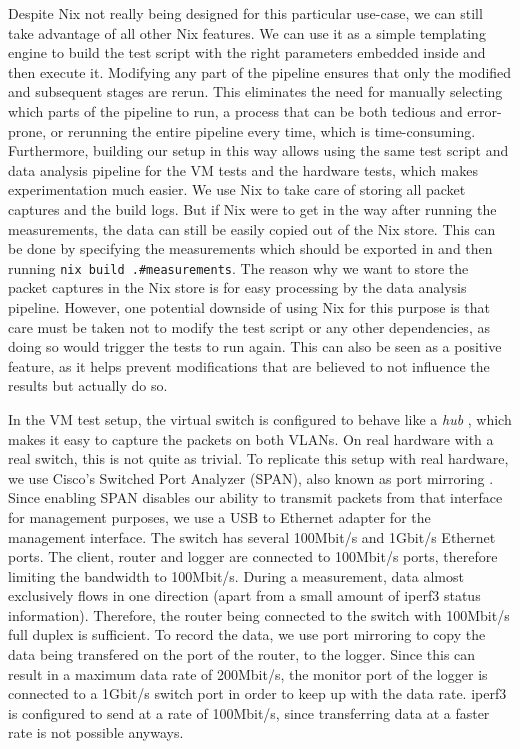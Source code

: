 Despite Nix not really being designed for this particular use-case, we can still take advantage of all other Nix features.
We can use it as a simple templating engine to build the test script with the right parameters embedded inside and then execute it.
Modifying any part of the pipeline ensures that only the modified and subsequent stages are rerun.
This eliminates the need for manually selecting which parts of the pipeline to run, a process that can be both tedious and error-prone, or rerunning the entire pipeline every time, which is time-consuming.
Furthermore, building our setup in this way allows using the same test script and data analysis pipeline for the VM tests and the hardware tests, which makes experimentation much easier.
We use Nix to take care of storing all packet captures and the build logs.
But if Nix were to get in the way after running the measurements, the data can still be easily copied out of the Nix store.
This can be done by specifying the measurements which should be exported in  and then running \texttt{nix build .#measurements}.
The reason why we want to store the packet captures in the Nix store is for easy processing by the data analysis pipeline.
However, one potential downside of using Nix for this purpose is that care must be taken not to modify the test script or any other dependencies, as doing so would trigger the tests to run again.
This can also be seen as a positive feature, as it helps prevent modifications that are believed to not influence the results but actually do so.

In the VM test setup, the virtual switch is configured to behave like a \textit{hub} \cite{wiki:Ethernet_hub} \cite{NixOS-VM-test-Hub}, which makes it easy to capture the packets on both VLANs.
On real hardware with a real switch, this is not quite as trivial.
To replicate this setup with real hardware, we use Cisco's Switched Port Analyzer (SPAN), also known as port mirroring \cite{cisco-span-tutorial}.
Since enabling SPAN disables our ability to transmit packets from that interface for management purposes, we use a USB to Ethernet adapter for the management interface.
The switch has several 100Mbit/s and 1Gbit/s Ethernet ports.
The client, router and logger are connected to 100Mbit/s ports, therefore limiting the bandwidth to 100Mbit/s.
During a measurement, data almost exclusively flows in one direction (apart from a small amount of iperf3 status information).
Therefore, the router being connected to the switch with 100Mbit/s full duplex is sufficient.
To record the data, we use port mirroring to copy the data being transfered on the port of the router, to the logger.
Since this can result in a maximum data rate of 200Mbit/s, the monitor port of the logger is connected to a 1Gbit/s switch port in order to keep up with the data rate.
iperf3 is configured to send at a rate of 100Mbit/s, since transferring data at a faster rate is not possible anyways.

